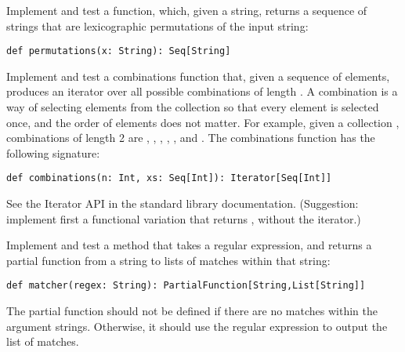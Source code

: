 \documentclass[11pt]{article}
\begin{document}

\begin{myExercise}
Implement and test a  function, which, given a string, returns a sequence of strings that are lexicographic permutations of the input string:
\begin{lstlisting}
def permutations(x: String): Seq[String]
\end{lstlisting}
\end{myExercise}

\begin{myExercise}
Implement and test a combinations function that, given a sequence of elements, produces an iterator over all possible combinations of length . A combination is a way of selecting elements from the collection so that every element is selected once, and the order of elements does not matter. For example, given a collection , combinations of length 2 are , , , , , and . The combinations function has the following signature:
\begin{lstlisting}
def combinations(n: Int, xs: Seq[Int]): Iterator[Seq[Int]]
\end{lstlisting}
See the Iterator API in the standard library documentation.
(Suggestion: implement first a functional variation that returns , without the iterator.)
\end{myExercise}

\begin{myExercise}
Implement and test a method that takes a regular expression, and returns a partial function from a string to lists of matches within that string:
\begin{lstlisting}
def matcher(regex: String): PartialFunction[String,List[String]]
\end{lstlisting}
The partial function should not be defined if there are no matches within the argument strings. Otherwise, it should use the regular expression to output the list of matches.
\end{myExercise}
\end{document}
